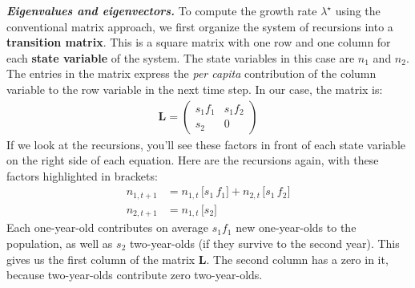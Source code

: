 \documentclass[10pt,reqno]{amsbook}
\newcommand{\bemph}[1]{{\textbf{\textcolor{bemphcol}{#1}}}}
\numberwithin{equation}{chapter}
\newenvironment{mathbox}[2]
{\begin{table}[#1]
\justify\begin{tcolorbox}[enhanced, oversize]\footnotesize\noindent\textbf{\emph{#2}}}
{\end{tcolorbox}\end{table}}
\begin{document}
\begin{mathbox}{p}{Eigenvalues and eigenvectors.}
To compute the growth rate $\lambda^{\!\!\star}$ using the conventional matrix approach, we first organize the system of recursions into a \bemph{transition matrix}. This is a square matrix with one row and one column for each \bemph{state variable} of the system. The state variables in this case are $n_1$ and $n_2$. The entries in the matrix express the \emph{per capita} contribution of the column variable to the row variable in the next time step. In our case, the matrix is:
\begin{align*}
	\mathbf L = \begin{pmatrix} s_1 f_1 & s_1 f_2 \\ s_2 & 0 \end{pmatrix}
\end{align*}
If we look at the recursions, you'll see these factors in front of each state variable on the right side of each equation. Here are the recursions again, with these factors highlighted in brackets:
\begin{align*}
	 n_{1,t+1} &= n_{1,t} \, \big[ s_1 \, f_1 \big]  + n_{2,t} \, \big[ s_1 \, f_2 \big]   \\
	 n_{2,t+1} &= n_{1,t} \, \big[ s_2 \big]
\end{align*}
Each one-year-old contributes on average $s_1 f_1$ new one-year-olds to the population, as well as $s_2$ two-year-olds (if they survive to the second year). This gives us the first column of the matrix $\mathbf L$. The second column has a zero in it, because two-year-olds contribute zero two-year-olds. %


\end{mathbox}
\end{document}
